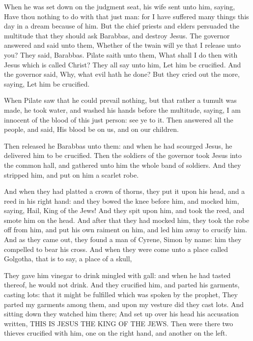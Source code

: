  When he was set down on the judgment seat, his wife sent
unto him, saying, Have thou nothing to do with that just man: for I have
suffered many things this day in a dream because of him. 
But the chief priests and elders persuaded the multitude that they
should ask Barabbas, and destroy Jesus.  The governor
answered and said unto them, Whether of the twain will ye that I release
unto you? They said, Barabbas.  Pilate saith unto them,
What shall I do then with Jesus which is called Christ? They all say
unto him, Let him be crucified.  And the governor said,
Why, what evil hath he done? But they cried out the more, saying, Let
him be crucified.

 When Pilate saw that he could prevail nothing, but that
rather a tumult was made, he took water, and washed his hands before the
multitude, saying, I am innocent of the blood of this just person: see
ye to it.  Then answered all the people, and said, His
blood be on us, and on our children.

 Then released he Barabbas unto them: and when he had
scourged Jesus, he delivered him to be crucified.  Then the
soldiers of the governor took Jesus into the common hall, and gathered
unto him the whole band of soldiers.  And they stripped
him, and put on him a scarlet robe.

 And when they had platted a crown of thorns, they put it
upon his head, and a reed in his right hand: and they bowed the knee
before him, and mocked him, saying, Hail, King of the Jews!
 And they spit upon him, and took the reed, and smote him
on the head.  And after that they had mocked him, they took
the robe off from him, and put his own raiment on him, and led him away
to crucify him.  And as they came out, they found a man of
Cyrene, Simon by name: him they compelled to bear his cross.
 And when they were come unto a place called Golgotha, that
is to say, a place of a skull,

 They gave him vinegar to drink mingled with gall: and when
he had tasted thereof, he would not drink.  And they
crucified him, and parted his garments, casting lots: that it might be
fulfilled which was spoken by the prophet, They parted my garments among
them, and upon my vesture did they cast lots.  And sitting
down they watched him there;  And set up over his head his
accusation written, THIS IS JESUS THE KING OF THE JEWS. 
Then were there two thieves crucified with him, one on the right hand,
and another on the left.

